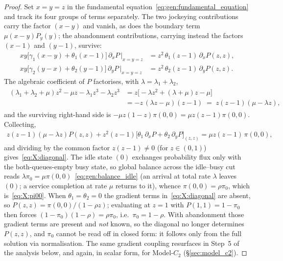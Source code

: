 \begin{proof}
    Set $x=y=z$ in the fundamental equation~\eqref{eq:gen:fundamental_equation} and
    track its four groups of terms separately. The two jockeying contributions carry the
    factor $(x-y)$ and vanish, as does the boundary term $\mu(x-y)P_y(y)$; the
    abandonment contributions, carrying instead the factors $(x-1)$ and $(y-1)$,
    survive:
    \begin{align}
        xy\bigl[\gamma_1(x-y)+\theta_1(x-1)\bigr]\,\partial_x P\,\Big|_{x=y=z}
        &= z^2\,\theta_1(z-1)\,\partial_x P(z,z),
        \nonumber\\
        xy\bigl[\gamma_2(y-x)+\theta_2(y-1)\bigr]\,\partial_y P\,\Big|_{x=y=z}
        &= z^2\,\theta_2(z-1)\,\partial_y P(z,z).
        \nonumber
    \end{align}
    The algebraic coefficient of $P$ factorises, with $\lambda=\lambda_1+\lambda_2$,
    \begin{align}
        \begin{split}
            (\lambda_1+\lambda_2+\mu)z^2-\mu z-\lambda_1 z^3-\lambda_2 z^3
            &= z\bigl[-\lambda z^2+(\lambda+\mu)z-\mu\bigr] \\
            &= -z\,(\lambda z-\mu)(z-1)
            \;=\; z(z-1)(\mu-\lambda z),
        \end{split}
        \nonumber
    \end{align}
    and the surviving right-hand side is $-\mu z(1-z)\pi(0,0)=\mu z(z-1)\pi(0,0)$.
    Collecting,
    \begin{align*}
        z(z-1)(\mu-\lambda z)P(z,z)
        + z^2(z-1)\bigl[\theta_1\,\partial_x P + \theta_2\,\partial_y P\bigr]_{(z,z)}
        = \mu z(z-1)\,\pi(0,0),
    \end{align*}
    and dividing by the common factor $z(z-1)\neq0$ (for $z\in(0,1)$)
    gives~\eqref{eq:X:diagonal}. The idle state $(0)$ exchanges probability flux only
    with the both-queues-empty busy state, so global balance across the idle--busy cut
    reads $\lambda\pi_0=\mu\pi(0,0)$~\eqref{eq:gen:balance_idle} (an arrival at total rate
    $\lambda$ leaves $(0)$; a service completion at rate $\mu$ returns to it), whence
    $\pi(0,0)=\rho\pi_0$, which is~\eqref{eq:X:pi00}. When $\theta_1=\theta_2=0$ the
    gradient terms in~\eqref{eq:X:diagonal} are absent, so
    $P(z,z)=\pi(0,0)/(1-\rho z)$; evaluating at $z=1$ with $P(1,1)=1-\pi_0$ then forces
    $(1-\pi_0)(1-\rho)=\rho\pi_0$, i.e.\ $\pi_0=1-\rho$. With abandonment those gradient
    terms are present and \emph{not} known, so the diagonal no longer determines
    $P(z,z)$, and $\pi_0$ cannot be read off in closed form: it follows only from the
    full solution via normalisation. The same gradient coupling resurfaces in Step~5 of
    the analysis below, and again, in scalar form, for Model-$C_2$
    (\S\ref{sec:model_c2}).
\end{proof}

